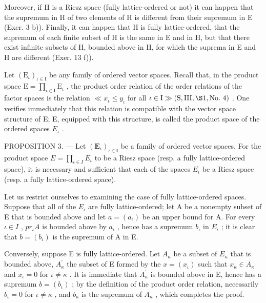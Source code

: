 Moreover, if H is a Riesz space (fully lattice-ordered or not) it can happen that the supremum in H of two elements of H is different from their supremum in E (Exer. 3 b)). Finally, it can happen that H is fully lattice-ordered, that the supremum of each finite subset of H is the same in E and in H, but that there exist infinite subsets of H, bounded above in H, for which the suprema in E and H are different (Exer. 13 f)).

Let \((\mathrm{E}_{\iota})_{\iota \in \mathrm{I}}\) be any family of ordered vector spaces. Recall that, in the product space \(\mathrm{E} = \prod_{\iota \in \mathrm{I}}\mathrm{E}_{\iota}\) , the product order relation of the order relations of the factor spaces is the relation \(\ll x_{\iota}\leqslant y_{\iota}\) for all \(\iota \in \mathrm{I}\gg (\mathrm{S},\mathrm{III},\S 1,\mathrm{No.~4})\) . One verifies immediately that this relation is compatible with the vector space structure of E; E, equipped with this structure, is called the product space of the ordered spaces \(E_{\iota}\) .

PROPOSITION 3. --- Let \((\mathbf{E}_{\iota})_{\iota\in\mathbb{I}}\) be a family of ordered vector spaces. For the product space \(E=\prod_{\iota\in I}E_{\iota}\) to be a Riesz space (resp. a fully lattice-ordered space), it is necessary and sufficient that each of the spaces \(E_{\iota}\) be a Riesz space (resp. a fully lattice-ordered space).

Let us restrict ourselves to examining the case of fully lattice-ordered spaces. Suppose that all of the \(E_{\iota}\) are fully lattice-ordered; let A be a nonempty subset of E that is bounded above and let \(a = (a_{\iota})\) be an upper bound for A. For every \(\iota \in I\) , \(pr_{\iota}A\) is bounded above by \(a_{\iota}\) , hence has a supremum \(b_{\iota}\) in \(E_{\iota}\) ; it is clear that \(b = (b_{\iota})\) is the supremum of A in E.

Conversely, suppose E is fully lattice-ordered. Let \(A_{\kappa}\) be a subset of \(E_{\kappa}\) that is bounded above, \(A_{\kappa}^{\prime}\) the subset of E formed by the \(x = (x_{\iota})\) such that \(x_{\kappa} \in A_{\kappa}\) and \(x_{\iota} = 0\) for \(\iota \neq \kappa\) . It is immediate that \(A_{\kappa}^{\prime}\) is bounded above in E, hence has a supremum \(b = (b_{\iota})\) ; by the definition of the product order relation, necessarily \(b_{\iota} = 0\) for \(\iota \neq \kappa\) , and \(b_{\kappa}\) is the supremum of \(A_{\kappa}\) , which completes the proof.

